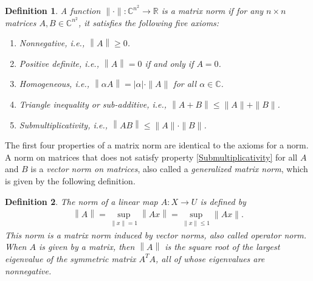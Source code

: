 \documentclass[11pt]{book}
\newtheorem{definition}{Definition}[chapter]
\theoremstyle{definition}
\numberwithin{equation}{chapter}
\begin{document}
\begin{definition}{\rm \cite{39}}\label{matrix_norm_def}
A function $\|\cdot \|: \mathbb{C}^{n^2} \to \mathbb{R}$ is a matrix norm if for any $n \times n$ matrices $A, B \in \mathbb{C}^{n^2}$, it satisfies the following five axioms:
\begin{enumerate}[label=(\arabic*)]
    \item Nonnegative, i.e., $\left\|A\right\| \geq 0$.
    
    \item Positive definite, i.e., $\left\|A\right\| = 0$ if and only if $A = 0$.
    
    \item Homogeneous, i.e., $\left\|\alpha A\right\|= |\alpha| \cdot \|A\|$ for all $\alpha \in \mathbb{C}$.
    
    \item Triangle inequality or sub-additive, i.e., $\left\|A + B\right\| \leq \|A\| + \|B\|$.
    
    \item Submultiplicativity, i.e., $\left\|A B\right\| \leq \|A\| \cdot \|B\|$. \label{Submultiplicativity}
\end{enumerate}
\end{definition}

The first four properties of a matrix norm are identical to the axioms for a norm. A norm on matrices that does not
satisfy property \ref{Submultiplicativity} for all $A$ and $B$ is a {\em vector norm on matrices}, also called a {\em generalized matrix norm}, which is given by the following definition.

\medskip

\begin{definition}\label{vector_norm_matrix_def}
The norm of a linear map $A:X\to U$ is defined by
\begin{align*}
    \left\|A\right\| = \sup_{\|x\| = 1} \left\|Ax\right\| = \sup_{\|x\| \leq 1} \|Ax\|.
\end{align*}
This norm is a matrix norm induced by vector norms, also called operator norm. When $A$ is given by a matrix, then $\left\|A\right\|$ is the square root of the largest eigenvalue of the symmetric matrix $A^TA$, all of whose eigenvalues are nonnegative.
\end{definition}

\medskip
\end{document}
